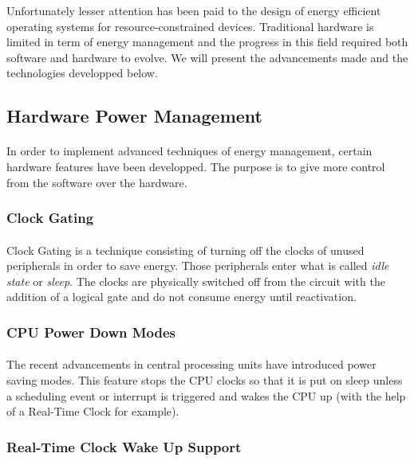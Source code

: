 Unfortunately lesser attention has been paid to the design of energy efficient operating systems for resource-constrained devices.
Traditional hardware is limited in term of energy management and the progress in this field required both software and hardware to evolve.
We will present the advancements made and the technologies developped below.


\subsection{Hardware Power Management}
\paragraph{}
In order to implement advanced techniques of energy management, certain hardware features have been developped.
The purpose is to give more control from the software over the hardware.

\subsubsection{Clock Gating}
\paragraph{}
Clock Gating is a technique consisting of turning off the clocks of unused peripherals in order to save energy.
Those peripherals enter what is called \textit{idle state} or \textit{sleep}.
The clocks are physically switched off from the circuit with the addition of a logical gate and do not consume energy until reactivation.

\subsubsection{CPU Power Down Modes}
\paragraph{}
The recent advancements in central processing units have introduced power saving modes.
This feature stops the CPU clocks so that it is put on sleep unless
    a scheduling event or interrupt is triggered and wakes the CPU up (with the help of a Real-Time Clock for example).

\subsubsection{Real-Time Clock Wake Up Support}
